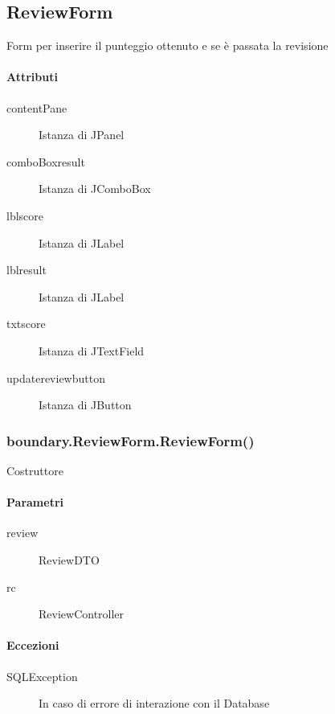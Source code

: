 \subsection{ReviewForm}
Form per inserire il punteggio ottenuto e se è passata la revisione
\paragraph{Attributi}
\begin{description}
\item[contentPane] Istanza di JPanel
\item[comboBoxresult] Istanza di JComboBox
\item[lblscore] Istanza di JLabel
\item[lblresult] Istanza di JLabel
\item[txtscore] Istanza di JTextField
\item[updatereviewbutton] Istanza di JButton
\end{description}
\subsubsection{boundary.ReviewForm.ReviewForm()}
Costruttore
\paragraph{Parametri}
\begin{description}
\item[review] ReviewDTO
\item[rc] ReviewController
\end{description}
\paragraph{Eccezioni}
\begin{description}
\item[SQLException]  In caso di errore di interazione con il Database
\end{description}











